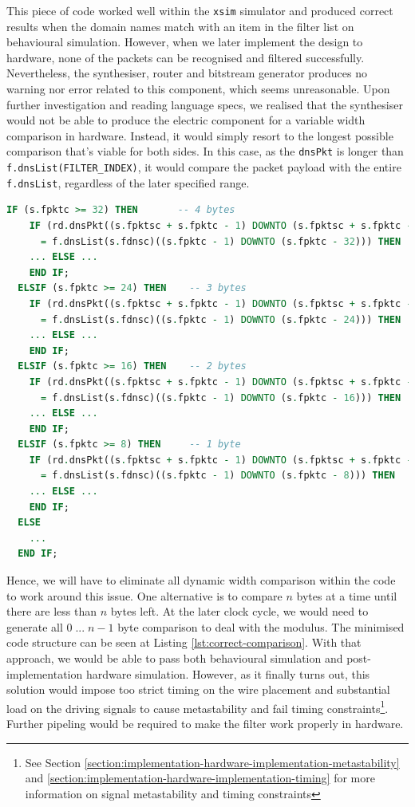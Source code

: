 \documentclass[a4paper]{report}
\newcommand{\proglang}{\textsf}
\newcommand{\code}{\texttt}
\begin{document}
This piece of code worked well within the \code{xsim} simulator and produced correct results when the domain names match with an item in the filter list on behavioural simulation. However, when we later implement the design to hardware, none of the packets can be recognised and filtered successfully. Nevertheless, the synthesiser, router and bitstream generator produces no warning nor error related to this component, which seems unreasonable. Upon further investigation and reading language specs, we realised that the synthesiser would not be able to produce the electric component for a variable width comparison in hardware. Instead, it would simply resort to the longest possible comparison that's viable for both sides. In this case, as the \code{dnsPkt} is longer than \code{f.dnsList(FILTER\_INDEX)}, it would compare the packet payload with the entire \code{f.dnsList}, regardless of the later specified range.

\begin{lstlisting}[language=VHDL, caption=Dynamic width \code{STD\_LOGIC\_VECTOR} comparison in \proglang{VHDL}, label={lst:correct-comparison}]
  IF (s.fpktc >= 32) THEN       -- 4 bytes
    IF (rd.dnsPkt((s.fpktsc + s.fpktc - 1) DOWNTO (s.fpktsc + s.fpktc - 32))
      = f.dnsList(s.fdnsc)((s.fpktc - 1) DOWNTO (s.fpktc - 32))) THEN
    ... ELSE ...
    END IF;
  ELSIF (s.fpktc >= 24) THEN    -- 3 bytes
    IF (rd.dnsPkt((s.fpktsc + s.fpktc - 1) DOWNTO (s.fpktsc + s.fpktc - 24))
      = f.dnsList(s.fdnsc)((s.fpktc - 1) DOWNTO (s.fpktc - 24))) THEN
    ... ELSE ...
    END IF;          
  ELSIF (s.fpktc >= 16) THEN    -- 2 bytes    
    IF (rd.dnsPkt((s.fpktsc + s.fpktc - 1) DOWNTO (s.fpktsc + s.fpktc - 16))
      = f.dnsList(s.fdnsc)((s.fpktc - 1) DOWNTO (s.fpktc - 16))) THEN
    ... ELSE ...
    END IF;                 
  ELSIF (s.fpktc >= 8) THEN     -- 1 byte
    IF (rd.dnsPkt((s.fpktsc + s.fpktc - 1) DOWNTO (s.fpktsc + s.fpktc - 8))
      = f.dnsList(s.fdnsc)((s.fpktc - 1) DOWNTO (s.fpktc - 8))) THEN
    ... ELSE ...
    END IF;
  ELSE
    ...
  END IF; 
\end{lstlisting}

Hence, we will have to eliminate all dynamic width comparison within the code to work around this issue. One alternative is to compare $n$ bytes at a time until there are less than $n$ bytes left. At the later clock cycle, we would need to generate all $0 \;...\;n-1$ byte comparison to deal with the modulus. The minimised code structure can be seen at Listing \ref{lst:correct-comparison}. With that approach, we would be able to pass both behavioural simulation and post-implementation hardware simulation. However, as it finally turns out, this solution would impose too strict timing on the wire placement and substantial load on the driving signals to cause metastability and fail timing constraints\footnote{See Section \ref{section:implementation-hardware-implementation-metastability} and \ref{section:implementation-hardware-implementation-timing} for more information on signal metastability and timing constraints}. Further pipeling would be required to make the filter work properly in hardware.
\end{document}
